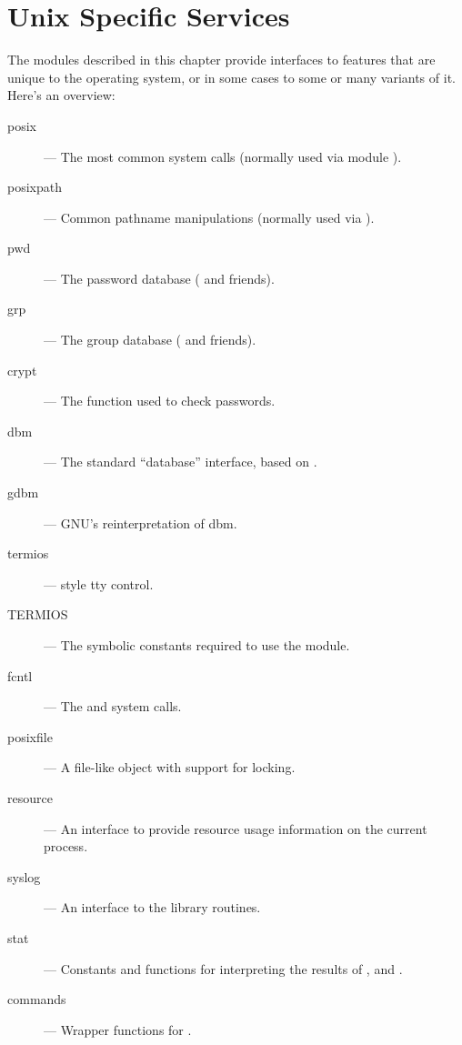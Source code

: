 \chapter{Unix Specific Services}
\label{unix}

The modules described in this chapter provide interfaces to features
that are unique to the \UNIX{} operating system, or in some cases to
some or many variants of it.  Here's an overview:

\begin{description}

\item[posix]
--- The most common \POSIX{} system calls (normally used via module
).

\item[posixpath]
--- Common \POSIX{} pathname manipulations (normally used via ).

\item[pwd]
--- The password database ( and friends).

\item[grp]
--- The group database ( and friends).

\item[crypt]
--- The  function used to check \UNIX{} passwords.

\item[dbm]
--- The standard ``database'' interface, based on .

\item[gdbm]
--- GNU's reinterpretation of dbm.

\item[termios]
--- \POSIX{} style tty control.

\item[TERMIOS]
--- The symbolic constants required to use the  module.

\item[fcntl]
--- The  and  system calls.

\item[posixfile]
--- A file-like object with support for locking.

\item[resource]
--- An interface to provide resource usage information on the current
process.

\item[syslog]
--- An interface to the \UNIX{}  library routines.

\item[stat]
--- Constants and functions for interpreting the results of
,  and .

\item[commands]
--- Wrapper functions for .

\end{description}
